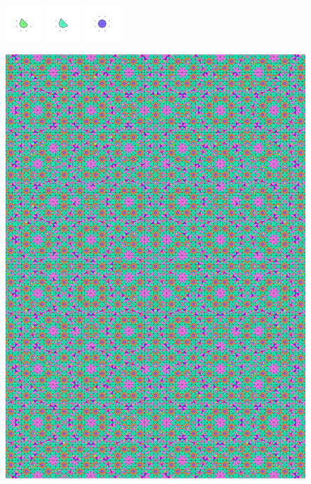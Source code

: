 \documentclass[text.tex]{subfiles}
\begin{document}
\begin{figure}[h!]
\includegraphics[width=0.12\textwidth]{img/results/circle8/circle8_216067_(3109_-1286alpha_2)_014.pdf}
\includegraphics[width=0.12\textwidth]{img/results/circle8/circle8_216067_(3109_-1286alpha_2)_015.pdf}
\includegraphics[width=0.12\textwidth]{img/results/circle8/circle8_216067_(3109_-1286alpha_2)_016.pdf}
\end{figure}

\begin{figure}[h!]
\centering
\includegraphics[width=1\textwidth]{img/results/circle8/quasi_circle_216067_(3109_-1286alpha_2).pdf}
\end{figure}
\end{document}
